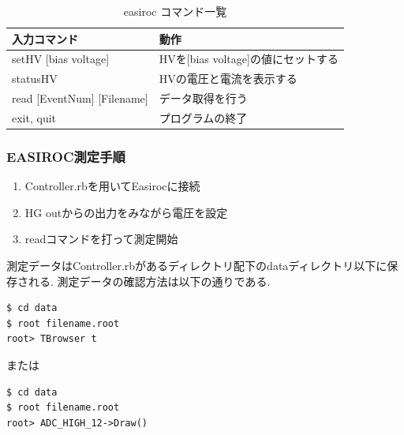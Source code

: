 \begin{table}[htbp]
  \begin{center}
    \caption{easiroc コマンド一覧}
    \label{table:easiroc_controller_commands}
    \begin{tabular}{|l|l|} \hline
      入力コマンド & 動作                                                     \\ \hline \hline
      setHV [bias voltage] & HVを[bias voltage]の値にセットする\\ \hline
      statusHV & HVの電圧と電流を表示する\\ \hline
      read [EventNum] [Filename] & データ取得を行う \\ \hline
      exit, quit & プログラムの終了\\ \hline
    \end{tabular}
  \end{center}
\end{table}

\subsubsection{EASIROC測定手順}
\begin{enumerate}
  \item Controller.rbを用いてEasirocに接続
  \item HG outからの出力をみながら電圧を設定
  \item readコマンドを打って測定開始
\end{enumerate}
測定データはController.rbがあるディレクトリ配下のdataディレクトリ以下に保存される.
測定データの確認方法は以下の通りである.
\begin{lstlisting}
$ cd data
$ root filename.root
root> TBrowser t
\end{lstlisting}
または
\begin{lstlisting}
$ cd data
$ root filename.root
root> ADC_HIGH_12->Draw()
\end{lstlisting}
